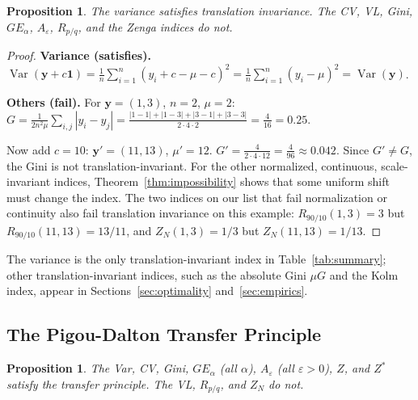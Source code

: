 \documentclass[12pt]{article}
\theoremstyle{plain}
\newtheorem{proposition}[theorem]{Proposition}
\theoremstyle{definition}
\theoremstyle{remark}
\newcommand{\bfy}{\mathbf{y}}
\newcommand{\bfone}{\mathbf{1}}
\begin{document}
\begin{proposition}\label{prop:trans}
The variance satisfies translation invariance.
The CV, VL, Gini, $GE_\alpha$, $A_\varepsilon$, $R_{p/q}$, and the Zenga indices do not.
\end{proposition}

\begin{proof}
\textbf{Variance (satisfies).}
$\operatorname{Var}(\bfy + c\bfone) = \frac{1}{n}\sum_{i=1}^n (y_i + c - \mu - c)^2 = \frac{1}{n}\sum_{i=1}^n (y_i - \mu)^2 = \operatorname{Var}(\bfy)$.

\textbf{Others (fail).}
For $\bfy = (1, 3)$, $n = 2$, $\mu = 2$:
$G = \frac{1}{2n^2\mu}\sum_{i,j}|y_i - y_j| = \frac{|1-1| + |1-3| + |3-1| + |3-3|}{2 \cdot 4 \cdot 2} = \frac{4}{16} = 0.25$.

Now add $c = 10$: $\bfy' = (11, 13)$, $\mu' = 12$.
$G' = \frac{4}{2 \cdot 4 \cdot 12} = \frac{4}{96} \approx 0.042$.
Since $G' \neq G$, the Gini is not translation-invariant.
For the other normalized, continuous, scale-invariant indices, Theorem~\ref{thm:impossibility} shows that some uniform shift must change the index.
The two indices on our list that fail normalization or continuity also fail translation invariance on this example: $R_{90/10}(1, 3) = 3$ but $R_{90/10}(11, 13) = 13/11$, and $Z_N(1, 3) = 1/3$ but $Z_N(11, 13) = 1/13$.
\end{proof}

The variance is the only translation-invariant index in Table~\ref{tab:summary}; other translation-invariant indices, such as the absolute Gini $\mu G$ and the Kolm index, appear in Sections~\ref{sec:optimality} and~\ref{sec:empirics}.

\subsection{The Pigou-Dalton Transfer Principle}

\begin{proposition}\label{prop:transfer}
The Var, CV, Gini, $GE_\alpha$ (all $\alpha$), $A_\varepsilon$ (all $\varepsilon > 0$), $Z$, and $Z^*$ satisfy the transfer principle.
The VL, $R_{p/q}$, and $Z_N$ do not.
\end{proposition}
\end{document}
